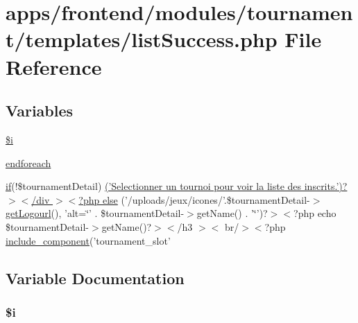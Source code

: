 \hypertarget{frontend_2modules_2tournament_2templates_2list_success_8php}{\section{apps/frontend/modules/tournament/templates/list\-Success.php File Reference}
\label{frontend_2modules_2tournament_2templates_2list_success_8php}
}
\subsection*{Variables}
\begin{DoxyCompactItemize}
\item 
\hyperlink{frontend_2modules_2tournament_2templates_2list_success_8php_a83018d9153d17d91fbcf3bc10158d34f}{\$i}
\item 
\hyperlink{frontend_2modules_2tournament_2templates_2list_success_8php_a672d9707ef91db026c210f98cc601123}{endforeach}
\item 
\hyperlink{live_2modules_2tournament_2templates_2__form_team_8php_ae30a307b320d8da5d9a945eaf68f7549}{if}(!\$tournament\-Detail) \hyperlink{frontend_2modules_2tournament_2templates_2list_success_8php_a66a4da4db315f7aff11e218f221c66fe}{('\-Selectionner un tournoi pour voir la liste des inscrits.')?$>$$<$/div $>$$<$?php else} ('/uploads/jeux/icones/'.\$tournament\-Detail-\/$>$\hyperlink{backend_2modules_2tournament_2templates_2index_success_8php_a35941bec2f3cf7beef9b8010a1342325}{get\-Logourl}(), 'alt=\char`\"{}' . \$tournament\-Detail-\/$>$get\-Name() . '\char`\"{}')?$>$$<$?php echo \$tournament\-Detail-\/$>$get\-Name()?$>$$<$/h3 $>$$<$ br/$>$$<$?php \hyperlink{frontend_2templates_2__navigation_8php_a0f87936cfbec594a177cabbcec470b8d}{include\-\_\-component}('tournament\-\_\-slot'
\end{DoxyCompactItemize}


\subsection{Variable Documentation}
\hypertarget{frontend_2modules_2tournament_2templates_2list_success_8php_a83018d9153d17d91fbcf3bc10158d34f}{
\subsubsection[{\$i}]{\setlength{\rightskip}{0pt plus 5cm}\${\bf i}}}\label{frontend_2modules_2tournament_2templates_2list_success_8php_a83018d9153d17d91fbcf3bc10158d34f}


